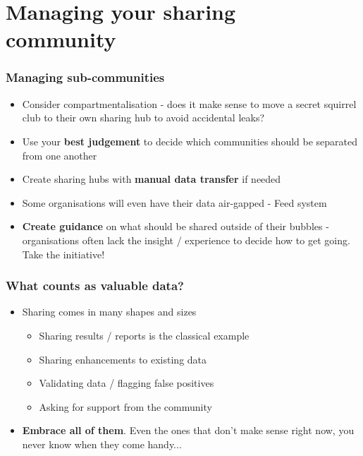 \section{Managing your sharing \\ community}

\begin{frame}
	\frametitle{Managing sub-communities}
	\begin{itemize}
		\item Consider compartmentalisation - does it make sense to move a secret squirrel club to their own sharing hub to avoid accidental leaks?
		\item Use your {\bf best judgement} to decide which communities should be separated from one another
		\item Create sharing hubs with {\bf manual data transfer} if needed
		\item Some organisations will even have their data air-gapped - Feed system
		\item {\bf Create guidance} on what should be shared outside of their bubbles - organisations often lack the insight / experience to decide how to get going. Take the initiative!
	\end{itemize}
\end{frame}

\begin{frame}
\frametitle{What counts as valuable data?}
\begin{itemize}
	\item Sharing comes in many shapes and sizes
	\begin{itemize}
		\item Sharing results / reports is the classical example
		\item Sharing enhancements to existing data
		\item Validating data / flagging false positives
		\item Asking for support from the community
	\end{itemize}
\item {\bf Embrace all of them}. Even the ones that don't make sense right now, you never know when they come handy...
\end{itemize}
\end{frame}

